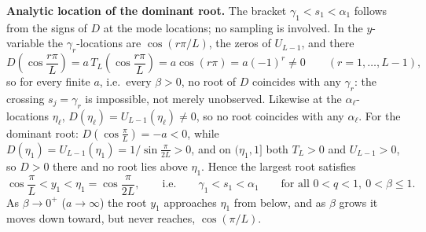 \documentclass[superscriptaddress, amsmath, amssymb, aps, pre, floatfix]{revtex4-2}
\begin{document}
\medskip
\noindent\textbf{Analytic location of the dominant root.}
The bracket \(\gamma_1<s_1<\alpha_1\) follows from the signs of \(D\) at the mode locations; no sampling is involved.  In the \(y\)-variable the \(\gamma_r\)-locations are \(\cos(r\pi/L)\), the zeros of \(U_{L-1}\), and there
\[
  D\!\left(\cos\frac{r\pi}{L}\right)
  =a\,T_L\!\left(\cos\frac{r\pi}{L}\right)
  =a\cos(r\pi)
  =a(-1)^r\neq0
  \qquad (r=1,\ldots,L-1),
\]
so for every finite \(a\), i.e.\ every \(\beta>0\), no root of \(D\) coincides with any \(\gamma_r\): the crossing \(s_j=\gamma_r\) is impossible, not merely unobserved.  Likewise at the \(\alpha_\ell\)-locations \(\eta_\ell\), \(D(\eta_\ell)=U_{L-1}(\eta_\ell)\neq0\), so no root coincides with any \(\alpha_\ell\).  For the dominant root: \(D(\cos\frac{\pi}{L})=-a<0\), while \(D(\eta_1)=U_{L-1}(\eta_1)=1/\sin\frac{\pi}{2L}>0\), and on \((\eta_1,1]\) both \(T_L>0\) and \(U_{L-1}>0\), so \(D>0\) there and no root lies above \(\eta_1\).  Hence the largest root satisfies
\[
  \cos\frac{\pi}{L}<y_1<\eta_1=\cos\frac{\pi}{2L},
  \qquad\text{i.e.}\qquad
  \gamma_1<s_1<\alpha_1
  \qquad\text{for all }0<q<1,\ 0<\beta\leq1 .
\]
As \(\beta\to0^+\) (\(a\to\infty\)) the root \(y_1\) approaches \(\eta_1\) from below, and as \(\beta\) grows it moves down toward, but never reaches, \(\cos(\pi/L)\).
\end{document}
